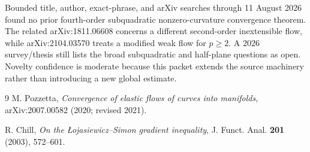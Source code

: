 \documentclass[11pt]{article}
\begin{document}
Bounded title, author, exact-phrase, and arXiv searches through 11 August
2026 found no prior fourth-order subquadratic nonzero-curvature convergence
theorem.  The related arXiv:1811.06608 concerns a different second-order
inextensible flow, while arXiv:2104.03570 treats a modified weak flow for
$p\ge2$.  A 2026 survey/thesis still lists the broad subquadratic and
half-plane questions as open.  Novelty confidence is moderate because this
packet extends the source machinery rather than introducing a new global
estimate.

\begin{thebibliography}{9}
M. Pozzetta,
\emph{Convergence of elastic flows of curves into manifolds},
arXiv:2007.00582 (2020; revised 2021).

R. Chill,
\emph{On the \L ojasiewicz--Simon gradient inequality},
J. Funct. Anal. \textbf{201} (2003), 572--601.
\end{thebibliography}
\end{document}

